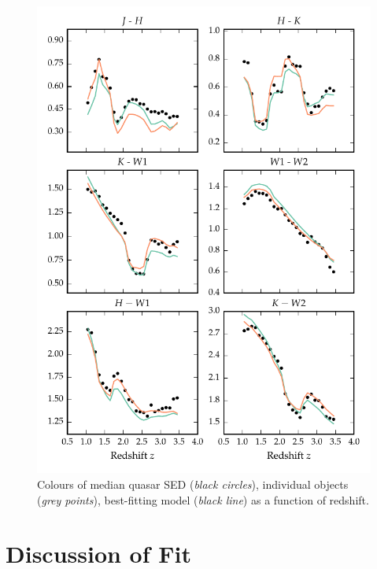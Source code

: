 \begin{figure}
\includegraphics[width=\textwidth]{figures/chapter05/sed_color_plot_2.pdf}
\caption{Colours of median quasar \ac{SED} ({\it black circles}), individual objects ({\it grey points}), best-fitting  model ({\it black line}) as a function of redshift.}
  \label{fig:color_2}
\end{figure} 

\section{Discussion of Fit}

